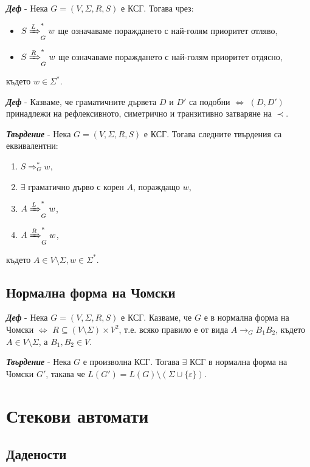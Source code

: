 \documentclass[fleqn,12pt]{article}
\begin{document}
\begin{flushleft}
\textit{\textbf{Деф}} - Нека $G = (V, \Sigma, R, S)$ е КСГ. Тогава чрез:
\begin{itemize}
    \item $S \xRightarrow[]{L}_G^* w$ ще означаваме пораждането с най-голям приоритет отляво,
    \item $S \xRightarrow[]{R}_G^* w$ ще означаваме пораждането с най-голям приоритет отдясно,
\end{itemize} 
където $w \in \Sigma^*$.

\textit{\textbf{Деф}} - Казваме, че граматичните дървета $D$ и $D'$ са подобни $\iff$ $(D, D')$ принадлежи на рефлексивното, симетрично и транзитивно затваряне на $\prec$.

\textit{\textbf{Твърдение}} - Нека $G = (V, \Sigma, R, S)$ е КСГ. Тогава следните твърдения са еквивалентни:
\begin{enumerate}
    \item $S \Rightarrow_G^* w$,
    \item $\exists$ граматично дърво с корен $A$, пораждащо $w$,
    \item $A \xRightarrow[]{L}_G^* w$,
    \item $A \xRightarrow[]{R}_G^* w$,
\end{enumerate}
където $A \in V \setminus \Sigma, w \in \Sigma^*$.

\subsection{Нормална форма на Чомски}

\textit{\textbf{Деф}} - Нека $G = (V, \Sigma, R, S)$ е КСГ. Казваме, че $G$ е в нормална форма на Чомски $\iff$ $R \subseteq (V \setminus \Sigma) \times V^2$, т.е. всяко правило е от вида $A \to_G B_1B_2$, където $A \in V \setminus \Sigma$, а $B_1, B_2 \in V$.

\textit{\textbf{Твърдение}} - Нека $G$ е произволна КСГ. Тогава $\exists$ КСГ в нормална форма на Чомски $G'$, такава че $L(G') = L(G) \setminus (\Sigma \cup \{\varepsilon\})$.

\section{Стекови автомати}

\subsection{Дадености}


\end{flushleft}
\end{document}
